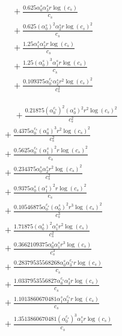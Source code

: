\documentclass[10pt]{article}
\begin{document}
\begin{align*}
&{}  + \frac{0.625 \alpha_{0}^s \alpha_{3}^s r \log{\left(c_{s} \right)}}{c_{s}} \\
&{}  + \frac{0.625 \left(\alpha_{0}^s\right)^{2} \alpha_{2}^s r \log{\left(c_{s} \right)}^{2}}{c_{s}} \\
&{}  + \frac{1.25 \alpha_{1}^s \alpha_{2}^s r \log{\left(c_{s} \right)}}{c_{s}} \\
&{}  + \frac{1.25 \left(\alpha_{0}^s\right)^{3} \alpha_{1}^s r \log{\left(c_{s} \right)}}{c_{s}} \\
&{}  + \frac{0.109375 \alpha_{0}^{c_s} \alpha_{2}^s r^{2} \log{\left(c_{s} \right)}^{2}}{c_{s}^{2}}
\end{align*}

\begin{align*}
\phantom{R_{3,6}} &\phantom{={}}{}  + \frac{0.21875 \left(\alpha_{0}^{c_s}\right)^{2} \left(\alpha_{0}^s\right)^{2} r^{2} \log{\left(c_{s} \right)}^{2}}{c_{s}^{2}} \\
&{}  + \frac{0.4375 \alpha_{0}^{c_s} \left(\alpha_{0}^s\right)^{3} r^{2} \log{\left(c_{s} \right)}^{2}}{c_{s}^{2}} \\
&{}  + \frac{0.5625 \alpha_{0}^{c_s} \left(\alpha_{1}^s\right)^{2} r \log{\left(c_{s} \right)}^{2}}{c_{s}} \\
&{}  + \frac{0.234375 \alpha_{0}^s \alpha_{2}^s r^{2} \log{\left(c_{s} \right)}^{2}}{c_{s}^{2}} \\
&{}  + \frac{0.9375 \alpha_{0}^s \left(\alpha_{1}^s\right)^{2} r \log{\left(c_{s} \right)}^{2}}{c_{s}} \\
&{}  + \frac{0.10546875 \alpha_{0}^{c_s} \left(\alpha_{0}^s\right)^{2} r^{3} \log{\left(c_{s} \right)}^{2}}{c_{s}^{3}} \\
&{}  + \frac{1.71875 \left(\alpha_{0}^s\right)^{2} \alpha_{1}^s r^{2} \log{\left(c_{s} \right)}}{c_{s}^{2}} \\
&{}  + \frac{0.3662109375 \alpha_{0}^s \alpha_{1}^s r^{3} \log{\left(c_{s} \right)}}{c_{s}^{3}} \\
&{}  + \frac{0.28379535568268 \alpha_{0}^s \alpha_{3}^{c_s} r \log{\left(c_{s} \right)}}{c_{s}} \\
&{}  + \frac{1.0337953556827 \alpha_{0}^{c_s} \alpha_{3}^s r \log{\left(c_{s} \right)}}{c_{s}} \\
&{}  + \frac{1.1013860670481 \alpha_{1}^s \alpha_{2}^{c_s} r \log{\left(c_{s} \right)}}{c_{s}} \\
&{}  + \frac{1.3513860670481 \left(\alpha_{0}^{c_s}\right)^{3} \alpha_{1}^s r \log{\left(c_{s} \right)}}{c_{s}} \\

\end{align*}
\end{document}
